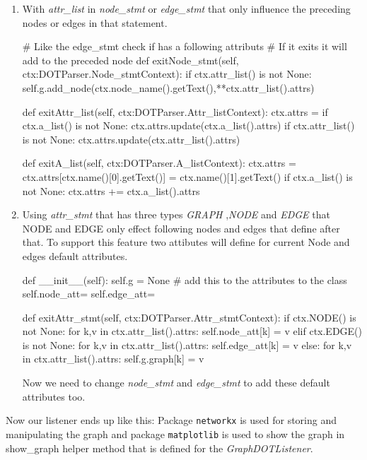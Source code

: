 \begin{enumerate}
\begin{enumerate}
 \item 
 With 
\textit{attr_list} in \textit{node_stmt} or 
\textit{edge_stmt} that only influence the preceding 
nodes or edges in that statement.

\begin{python}
# Like the edge_stmt check if has a following attributs
# If it exits it will add to the preceded node
def exitNode_stmt(self, ctx:DOTParser.Node_stmtContext):
    if ctx.attr_list() is not None:
        self.g.add_node(ctx.node_name().getText(),**ctx.attr_list().attrs)

def exitAttr_list(self, ctx:DOTParser.Attr_listContext):
    ctx.attrs = {}
    if ctx.a_list() is not None:
        ctx.attrs.update(ctx.a_list().attrs)
        if ctx.attr_list() is not None:
            ctx.attrs.update(ctx.attr_list().attrs)
    
def exitA_list(self, ctx:DOTParser.A_listContext):
    ctx.attrs = {}
    ctx.attrs[ctx.name()[0].getText()] = ctx.name()[1].getText()
    if ctx.a_list() is not None:
        ctx.attrs += ctx.a_list().attrs
\end{python}

\item
Using \textit{attr_stmt} that has three types \textit{GRAPH}
,\textit{NODE} and \textit{EDGE} that NODE and EDGE only effect
following nodes and edges that define after that. To support this
feature two attibutes will define for current Node and edges
default attributes.
\begin{python}

def __init__(self):
   self.g = None
   # add this to the attributes to the class
   self.node_att={}
   self.edge_att={}

def exitAttr_stmt(self, ctx:DOTParser.Attr_stmtContext):
    if ctx.NODE() is not None:
        for k,v in ctx.attr_list().attrs:
            self.node_att[k] = v 
    elif ctx.EDGE() is not None:
        for k,v in ctx.attr_list().attrs:
            self.edge_att[k] = v
    else:
        for k,v in ctx.attr_list().attrs:
            self.g.graph[k] = v
\end{python}
Now we need to change \textit{node_stmt} and \textit{edge_stmt}
to add these default attributes too.
\end{enumerate}

\end{enumerate}
Now our listener ends up like this:
Package \texttt{networkx} is used for storing and manipulating
the graph and package \texttt{matplotlib} is used to show
the graph in show_graph helper method that is defined for
the \textit{GraphDOTListener}.


